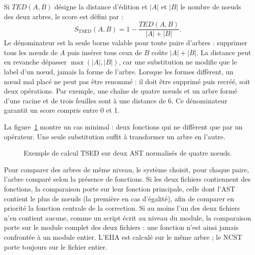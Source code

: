 \documentclass[12pt,a4paper,oneside]{report}
\begin{document}
Si $TED(A,B)$ désigne la distance d'édition et $|A|$ et $|B|$ le nombre de
nœuds des deux arbres, le score est défini par :
\begin{equation}
S_{\mathrm{TSED}}(A,B) = 1 - \frac{TED(A,B)}{|A| + |B|}.
\end{equation}
Le dénominateur est la seule borne valable pour toute paire d'arbres :
supprimer tous les nœuds de $A$ puis insérer tous ceux de $B$ coûte
$|A| + |B|$. La distance peut en revanche dépasser $\max(|A|,|B|)$, car une
substitution ne modifie que le label d'un nœud, jamais la forme de l'arbre.
Lorsque les formes diffèrent, un nœud mal placé ne peut pas être renommé : il
doit être supprimé puis recréé, soit deux opérations. Par exemple, une chaîne
de quatre nœuds et un arbre formé d'une racine et de trois feuilles sont à une
distance de 6. Ce dénominateur garantit un score compris entre 0 et 1.

La figure~\ref{fig:tsed} montre un cas minimal : deux fonctions qui ne
diffèrent que par un opérateur. Une seule substitution suffit à transformer un
arbre en l'autre.

\begin{figure}[htbp]
\centering
{}
\caption{Exemple de calcul TSED sur deux AST normalisés de quatre nœuds.}
\label{fig:tsed}
\end{figure}

Pour comparer des arbres de même niveau, le système choisit, pour chaque
paire, l'arbre comparé selon la présence de fonctions. Si les deux fichiers
contiennent des fonctions, la comparaison porte sur leur fonction
principale, celle dont l'AST contient le plus de nœuds (la première en cas
d'égalité), afin de comparer en priorité la fonction centrale de la
correction. Si au moins l'un des deux fichiers n'en contient aucune, comme un
script écrit au niveau du module, la comparaison porte sur le module complet
des deux fichiers : une fonction n'est ainsi jamais confrontée à un module
entier. L'EIIA est calculé sur le même arbre ; le NCST porte toujours sur le
fichier entier.
\end{document}
